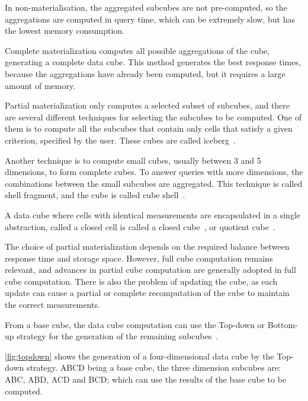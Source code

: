 In non-materialisation, the aggregated subcubes are not pre-computed, so the aggregations are computed in query time, which can be extremely slow, but has the lowest memory consumption.

Complete materialization computes all possible aggregations of the cube, generating a complete data cube.
This method generates the best response times, because the aggregations have already been computed, but it requires a large amount of memory.

Partial materialization only computes a selected subset of subcubes, and there are several different techniques for selecting the subcubes to be computed.
One of them is to compute all the subcubes that contain only cells that satisfy a given criterion, specified by the user.
These cubes are called iceberg~\cite{beyerBottomupComputationSparse1999}.

Another technique is to compute small cubes, usually between 3 and 5 dimensions, to form complete cubes.
To answer queries with more dimensions, the combinations between the small subcubes are aggregated.
This technique is called shell fragment, and the cube is called cube shell~\cite{liHighdimensionalOLAPMinimal2004}.

A data cube where cells with identical measurements are encapsulated in a single abstraction, called a closed cell is called a closed cube~\cite{dongxinCCubingEfficientComputation2006}, or quotient cube~\cite{lakshmananQuotientCubeHow2002}.

The choice of partial materialization depends on the required balance between response time and storage space.
However, full cube computation remains relevant, and advances in partial cube computation are generally adopted in full cube computation.
There is also the problem of updating the cube, as each update can cause a partial or complete recomputation of the cube to maintain the correct measurements.

From a base cube, the data cube computation can use the Top-down or Bottom-up strategy for the generation of the remaining subcubes~\cite{hanDataMiningConcepts2011}.

\autoref{fig:topdown} shows the generation of a four-dimensional data cube by the Top-down strategy.
ABCD being a base cube, the three dimension subcubes are: ABC, ABD, ACD and BCD; which can use the results of the base cube to be computed.

